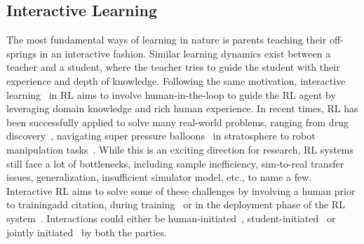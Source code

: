 \documentclass[twoside,11pt]{article}
\begin{document}
\subsection{Interactive Learning}
\label{IRLBackground}

    
    The most fundamental ways of learning in nature is parents teaching their off-springs in an interactive fashion. Similar learning dynamics exist between a teacher and a student, where the teacher tries to guide the student with their experience and depth of knowledge. Following the same motivation, interactive learning~\citep{Arzate:2020:SurveyInteractiveRL} in RL aims to involve human-in-the-loop to guide the RL agent by leveraging domain knowledge and rich human experience. In recent times,  RL has been successfully applied to solve many real-world problems, ranging from drug discovery~\citep{popova2018deep}, navigating super pressure balloons~\citep{bellemare2020autonomous} in stratosphere to robot manipulation tasks~\citep{nguyen2019review}. While this is an exciting direction for research, RL systems still face a lot of bottlenecks, including sample inefficiency, sim-to-real transfer issues, generalization, insufficient simulator model, etc., to name a few. Interactive RL aims to solve some of these challenges by involving a human prior to training{add citation}, during training~\citep{Knox:2008:TAMER} or in the deployment phase of the RL system~\citep{guo2021edge}. Interactions could either be human-initiated~\citep{torrey2013teaching}, student-initiated~\citep{da2020uncertainty} or jointly initiated~\citep{amir2016interactive} by both the parties.
\end{document}
